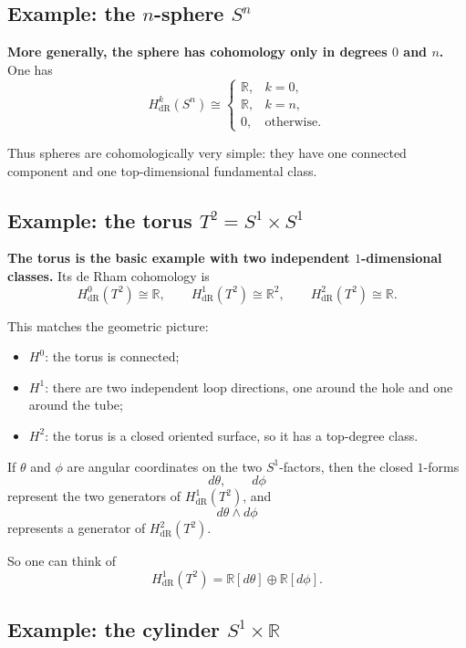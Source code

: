 \documentclass[12pt,a4paper]{article}
\theoremstyle{notespace}
\begin{document}
\subsection{Example: the \(n\)-sphere \(S^n\)}

\textbf{More generally, the sphere has cohomology only in degrees \(0\) and \(n\).} One has
\[
H^k_{\mathrm{dR}}(S^n)\cong
\begin{cases}
	\mathbb{R}, & k=0,\\
	\mathbb{R}, & k=n,\\
	0, & \text{otherwise}.
\end{cases}
\]

Thus spheres are cohomologically very simple: they have one connected component and one top-dimensional fundamental class.

\subsection{Example: the torus \(T^2=S^1\times S^1\)}

\textbf{The torus is the basic example with two independent \(1\)-dimensional classes.} Its de Rham cohomology is
\[
H^0_{\mathrm{dR}}(T^2)\cong \mathbb{R},
\qquad
H^1_{\mathrm{dR}}(T^2)\cong \mathbb{R}^2,
\qquad
H^2_{\mathrm{dR}}(T^2)\cong \mathbb{R}.
\]

This matches the geometric picture:

\begin{itemize}
	\item \(H^0\): the torus is connected;
	\item \(H^1\): there are two independent loop directions, one around the hole and one around the tube;
	\item \(H^2\): the torus is a closed oriented surface, so it has a top-degree class.
\end{itemize}

If \(\theta\) and \(\phi\) are angular coordinates on the two \(S^1\)-factors, then the closed \(1\)-forms
\[
d\theta,\qquad d\phi
\]
represent the two generators of \(H^1_{\mathrm{dR}}(T^2)\), and
\[
d\theta\wedge d\phi
\]
represents a generator of \(H^2_{\mathrm{dR}}(T^2)\).

So one can think of
\[
H^1_{\mathrm{dR}}(T^2)
=
\mathbb{R}[d\theta]\oplus \mathbb{R}[d\phi].
\]

\subsection{Example: the cylinder \(S^1\times \mathbb{R}\)}
\end{document}
